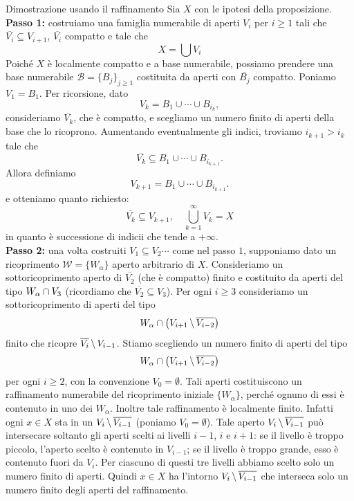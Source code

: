 \documentclass[a4paper]{article}
\begin{document}
\begin{snippetproof}{Dimostrazione usando il raffinamento}
    Sia \(X\) con le ipotesi della proposizione. \\
    \textbf{Passo 1:} costruiamo una famiglia numerabile di aperti \(V_i\) per \(i \geq 1\) tali che
    \(\overline {V_i} \subseteq V_{i+1}\), \(\overline {V_i}\) compatto e tale che \[
        X = \bigcup V_i
    \]
    Poiché \(X\) è localmente compatto e a base numerabile, possiamo prendere
    una base numerabile \(\mathcal B = \{B_j\}_{j \geq 1}\)
    costituita da aperti con \(\overline{B_j}\) compatto.
    Poniamo \(V_1 = B_1\).
    Per ricorsione, dato
    \[
        V_k = B_1 \cup \cdots \cup B_{i_k},
    \]
    consideriamo \(\overline {V_k}\), che è compatto, e scegliamo un numero finito
    di aperti della base che lo ricoprono. Aumentando eventualmente gli indici,
    troviamo \(i_{k+1} > i_k\) tale che \[
        \overline {V_k} \subseteq B_1 \cup \cdots \cup B_{i_{k+1}}.
    \]
    Allora definiamo \[
        V_{k+1} = B_1 \cup \cdots \cup B_{i_{k+1}}.
    \]
    e otteniamo quanto richiesto:
    \[
        \overline {V_k} \subseteq V_{k+1}, \quad
        \bigcup_{k=1}^\infty V_k = X
    \]
    in quanto è successione di indicii che tende a \(+\infty\). \\
    \textbf{Passo 2:}
    una volta costruiti \(V_1 \subseteq V_2 \cdots\) come nel passo \(1\),
    supponiamo dato un ricoprimento \(\mathcal W = \{W_\alpha\}\)
    aperto arbitrario di \(X\). Consideriamo
    un sottoricoprimento aperto di \(\overline {V_2}\)
    (che è compatto) finito e costituito da aperti del tipo
    \(W_\alpha \cap V_3\)
    (ricordiamo che \(\overline {V_2} \subseteq V_3\)).
    Per ogni \(i \geq 3\) consideriamo un sottoricoprimento di aperti del tipo \[
        W_\alpha \cap \left(V_{i+1} \,\backslash\, \overline{V_{i-2}}\right)
    \]
    finito che ricopre \(\overline {V_i} \,\backslash\, V_{i-1}\).
    Stiamo scegliendo un numero finito di aperti del tipo
    \[
        W_\alpha \cap \left(V_{i+1} \,\backslash\, \overline{V_{i-2}}\right)
    \]
    per ogni \(i \geq 2\), con la convenzione \(V_0 = \emptyset\).
    Tali aperti costituiscono un raffinamento numerabile
    del ricoprimento iniziale \(\{W_\alpha\}\), perché ognuno di essi
    è contenuto in uno dei \(W_\alpha\).
    Inoltre tale raffinamento è localmente finito.
    Infatti ogni \(x \in X\) sta in un \(V_i \,\backslash\, \overline {V_{i-1}}\)
    (poniamo \(V_0 = \emptyset\)). Tale aperto \(V_i \,\backslash\, \overline {V_{i-1}}\)
    può intersecare soltanto gli aperti scelti ai livelli \(i-1\), \(i\) e \(i+1\):
    se il livello è troppo piccolo, l'aperto scelto è contenuto in \(V_{i-1}\);
    se il livello è troppo grande, esso è contenuto fuori da \(V_i\).
    Per ciascuno di questi tre livelli abbiamo scelto solo un numero finito
    di aperti. Quindi \(x \in X\) ha l'intorno
    \(V_i \,\backslash\, \overline {V_{i-1}}\)
    che interseca solo un numero finito degli aperti del raffinamento.
\end{snippetproof}
\end{document}
